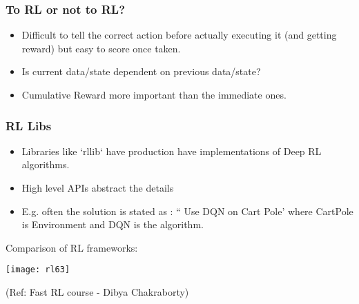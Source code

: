 \begin{frame}[fragile]\frametitle{To RL or not to RL?}

\begin{itemize}
\item Difficult to tell the correct action before actually executing it (and getting reward) but easy to score once taken.
\item Is current data/state dependent on previous data/state?
\item Cumulative Reward more important than the immediate ones.
\end{itemize}
\end{frame}



\begin{frame}[fragile]\frametitle{RL Libs}

\begin{itemize}
\item Libraries like `rllib` have production have implementations of Deep RL algorithms.
\item High level APIs abstract the details
\item E.g. often the solution is stated as : `` Use DQN on Cart Pole' where CartPole is Environment and DQN is the algorithm.
\end{itemize}

Comparison of RL frameworks:

\begin{center}
\texttt{[image: rl63]}

{\tiny (Ref: Fast RL course - Dibya Chakraborty)}
\end{center}

\end{frame}